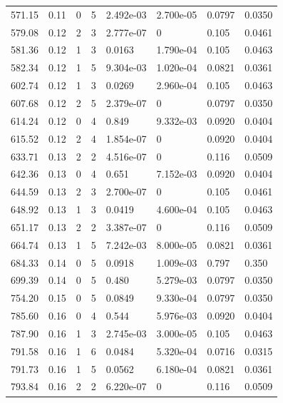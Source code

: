 \documentclass[preview]{standalone}
\begin{document}
{{{\begin{tabular}{L{1.2cm}C{1.2cm} C{0.3cm}C{0.5cm} C{1.4cm}C{1.4cm} C{1.4cm}C{1.4cm}}
  571.15  &  0.11  & 0     &  5 &  2.492e-03  & 2.700e-05  & 0.0797 &  0.0350   \\ 
  579.08  &  0.12  & 2     &  3 &  2.777e-07  & 0  & 0.105 &  0.0461   \\ 
  581.36  &  0.12  & 1     &  3 &  0.0163  & 1.790e-04  & 0.105 &  0.0463   \\ 
  582.34  &  0.12  & 1     &  5 &  9.304e-03  & 1.020e-04  & 0.0821 &  0.0361   \\ 
  602.74  &  0.12  & 1     &  3 &  0.0269  & 2.960e-04  & 0.105 &  0.0463   \\ 
  607.68  &  0.12  & 2     &  5 &  2.379e-07  & 0  & 0.0797 &  0.0350   \\ 
  614.24  &  0.12  & 0     &  4 &  0.849  & 9.332e-03  & 0.0920 &  0.0404   \\ 
  615.52  &  0.12  & 2     &  4 &  1.854e-07  & 0  & 0.0920 &  0.0404   \\ 
  633.71  &  0.13  & 2     &  2 &  4.516e-07  & 0  & 0.116 &  0.0509   \\ 
  642.36  &  0.13  & 0     &  4 &  0.651  & 7.152e-03  & 0.0920 &  0.0404   \\ 
  644.59  &  0.13  & 2     &  3 &  2.700e-07  & 0  & 0.105 &  0.0461   \\ 
  648.92  &  0.13  & 1     &  3 &  0.0419  & 4.600e-04  & 0.105 &  0.0463   \\ 
  651.17  &  0.13  & 2     &  2 &  3.387e-07  & 0  & 0.116 &  0.0509   \\ 
  664.74  &  0.13  & 1     &  5 &  7.242e-03  & 8.000e-05  & 0.0821 &  0.0361   \\ 
  684.33  &  0.14  & 0     &  5 &  0.0918  & 1.009e-03  & 0.797 &  0.350   \\ 
  699.39  &  0.14  & 0     &  5 &  0.480  & 5.279e-03  & 0.0797 &  0.0350   \\ 
  754.20  &  0.15  & 0     &  5 &  0.0849  & 9.330e-04  & 0.0797 &  0.0350   \\ 
  785.60  &  0.16  & 0     &  4 &  0.544  & 5.976e-03  & 0.0920 &  0.0404   \\ 
  787.90  &  0.16  & 1     &  3 &  2.745e-03  & 3.000e-05  & 0.105 &  0.0463   \\ 
  791.58  &  0.16  & 1     &  6 &  0.0484  & 5.320e-04  & 0.0716 &  0.0315   \\ 
  791.73  &  0.16  & 1     &  5 &  0.0562  & 6.180e-04  & 0.0821 &  0.0361   \\ 
  793.84  &  0.16  & 2     &  2 &  6.220e-07  & 0  & 0.116 &  0.0509   \\ 

\end{tabular}}}}
\end{document}
